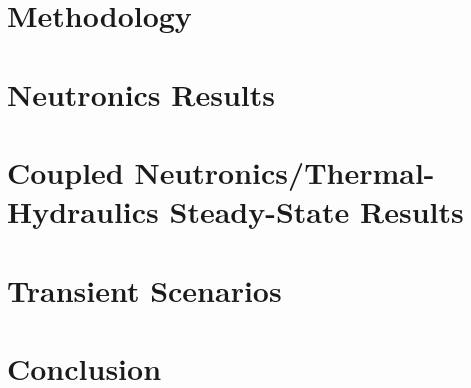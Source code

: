 \documentclass[edeposit,fullpage,11pt]{uiucthesis2018}
\begin{document}
\chapter{Methodology}
\label{chap:model}


\chapter{Neutronics Results}
\label{chap:nts}


\chapter{Coupled Neutronics/Thermal-Hydraulics Steady-State Results}
\label{chap:ss}


\chapter{Transient Scenarios}
\label{chap:transient}


\chapter{Conclusion}
\label{chap:conclusion}

%
%

\backmatter



\end{document}

